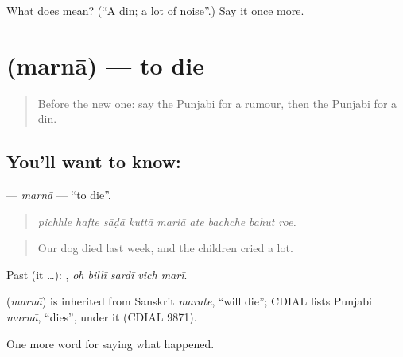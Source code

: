\begin{tcolorbox}[breakable,colback=teal!4,colframe=teal!35!black,title={Before you move on}]
What does  mean? (\textquotedblleft{}A din; a lot of noise\textquotedblright{}.) Say it once more.
\end{tcolorbox}
\section[\texorpdfstring{\pa{ਮਰਨਾ} (marnā)}{ਮਰਨਾ (marnā)}]{ (marnā) — to die}

\label{lesson:PA-C309-marna}



\begin{quote}
Before the new one: say the Punjabi for a rumour, then the Punjabi for a din.
\end{quote}

\subsection*{You'll want to know: }
\textbf{} — \emph{marnā} — \textquotedblleft{}to die\textquotedblright{}.

\begin{quote}
        
\end{quote}

\begin{quote}
\emph{pichhle hafte sāḍā kuttā mariā ate bachche bahut roe.}
\end{quote}

\begin{quote}
Our dog died last week, and the children cried a lot.
\end{quote}

Past (it …):     , \emph{oh billī sardī vich marī}.

\begin{cousinweb}
\textbf{} (\emph{marnā}) is inherited from Sanskrit \emph{marate}, \textquotedblleft{}will die\textquotedblright{}; CDIAL lists Punjabi \emph{marnā}, \textquotedblleft{}dies\textquotedblright{}, under it (CDIAL 9871).
\end{cousinweb}

\begin{grammarlens}[title={What you've built}]
One more word for saying what happened.
\end{grammarlens}

